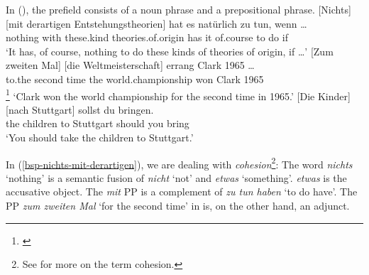 In (), the prefield consists of a noun phrase and a prepositional phrase.
\ea 
\gll {}[Nichts] [mit derartigen Entstehungstheorien] hat es natürlich zu tun, wenn \ldots \label{bsp-nichts-mit-derartigen}\footnotemark\\
	 \spacebr{}nothing \spacebr{}with these.kind theories.of.origin has it of.course to do if\\      
\glt `It has, of course, nothing to do these kinds of theories of origin, if \ldots'
\ex 
\gll {}[Zum zweiten Mal] [die Weltmeisterschaft] errang Clark 1965 \ldots\\
	   \spacebr{}to.the second time \spacebr{}the world.championship won Clark 1965 {}\\
\footnote{
        \citep*[]{Benes71}
      }\label{bsp-zum-zweiten-mal-die-Weltmeisterschaft}
\glt `Clark won the world championship for the second time in 1965.'
\ex\label{die-kinder-nach-stuttgart}
\gll {}[Die Kinder] [nach Stuttgart] sollst du bringen.\footnotemark\\
     \spacebr{}the children \spacebr{}to Stuttgart should you bring\\
\glt `You should take the children to Stuttgart.'
\z



\noindent
In (\ref{bsp-nichts-mit-derartigen}), we are dealing with \emph{cohesion}\footnote{
			See  for more on the term cohesion.
}: The word \emph{nichts} `nothing' is a semantic fusion of  \emph{nicht} `not'
and \emph{etwas} `something'.  \emph {etwas} is the accusative object. The \emph{mit} PP is a
complement of \emph{zu tun haben} `to do have'.
The PP \emph{zum zweiten Mal} `for the second time' in  is, on the other hand,
an adjunct.


\begin{comment}
Reviewer: raus

\citet[\page 69]{Fanselow93a} diskutiert das folgende Beispiel:
\ea
In Hamburg eine Wohnung hätte er sich besser nicht suchen sollen.
\z
Bei diesem Beispiel handelt es sich aber wahrscheinlich im NP-interne Voranstellung, wie sie
\zb von \citet[\page 68]{Fortmann96a-unread-gekauft} für (\mex{1}) in Erwägung gezogen wird:
\ea
Mit der Bahn eine Reise ist nicht geplant.
\z
\citet[\page 133]{Abb94} analysiert solche Voranstellungen als DP-interne Topikalisierungen.
Er ordnet auch folgende Beispiele als umgangsprachlich möglich ein:
\eal
\ex Übermorgen das Spiel gegen Kaiserslautern würde ich gern live sehen.
\ex Der die Karten hat, der Mann, soll gleich kommen.
\ex An der Wand das Bild kommt mir bekannt vor.
\zl
Bei (\mex{0}b) sieht man besonders deutlich, daß es sich nicht um eine Mehrfachbesetzung
des Vorfelds handeln kann, da der Relativsatz ja allein nicht vorfeldfähig ist. Solche Beispiele
sollen in diesem Aufsatz nicht behandelt werden.
\end{comment}

